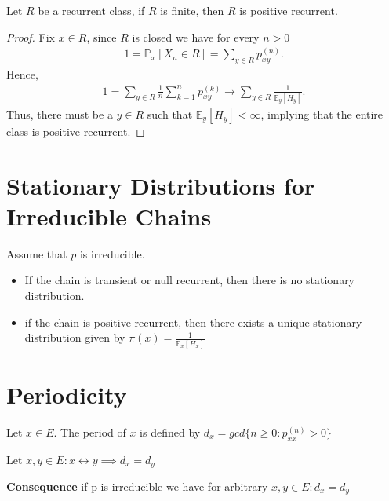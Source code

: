 \begin{prop}[]
	Let $R$ be a recurrent class, if $R$ is finite, then $R$ is positive recurrent.
\end{prop}
\begin{proof}
	Fix $x\in R$, since $R$ is closed we have for every $n> 0$
	\begin{align}
		1 = \mathbb{P}_{x} \left[ X_n \in R \right] = \sum_{y\in R}^{} p_{xy}^{(n)}.
	\end{align}
Hence, 
\begin{align}
	1 = \sum_{y\in R}^{} \frac{1}{n} \sum_{k=1}^{n} p_{xy}^{(k)} \to \sum_{y \in R}^{} \frac{1}{\mathbb{E}_{y} \left[ H_y \right] }.
\end{align}
Thus, there must be a $y\in R$ such that $\mathbb{E}_{y} \left[ H_y \right] < \infty $, implying that the entire class is positive recurrent.
\end{proof}


\section{Stationary Distributions for Irreducible Chains}
\begin{theorem}[]
	Assume that $p$ is irreducible. 
\begin{itemize}
	\item If the chain is transient or null recurrent, then there is no stationary distribution.
	\item if the chain is positive recurrent, then there exists a unique stationary distribution given by $\pi (x) = \frac{1}{\mathbb{E}_{x} \left[ H_x \right] }$
\end{itemize}

\end{theorem}

\section{Periodicity}
\begin{defn}
	Let $x \in E$. The period of $x$ is defined by $d_x = gcd\{n\geq 0: p_{xx}^{(n)}>0\}$
\end{defn}

\begin{prop}[]
	Let $x,y \in E: x \leftrightarrow y \implies d_x=d_y$
\end{prop}

\textbf{Consequence} if p is irreducible we have for arbitrary $x,y \in E: d_x = d_y$ 

